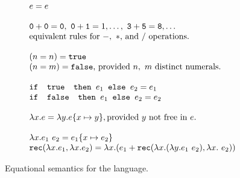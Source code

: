 \begin{figure}
\[
\begin{array}{lr}
e = e \\ \\
\texttt{0} + \texttt{0} = \texttt{0}, \ \texttt{0} + \texttt{1} = 1, \ldots, \ \texttt{3} + \texttt{5} = \texttt{8}, \ldots  \\
\text{equivalent rules for } -, \ * \text{, and } /\text{ operations.}
\\ \\
(n =n) = \texttt{true} \\ (n=m) = \texttt{false}\text{, provided } n, \ m \text{ distinct numerals.}\\ \\ 
\ifelse{\texttt{ true }}{e_1}{e_2} = e_1 \\
\ifelse{\texttt{ false }}{e_1}{e_2} = e_2 \\ \\ 
\lambda x.e = \lambda y.e\{x \mapsto y \}, \text{provided } y \text{ not free in } e. \\ \\ 
\lambda x.e_1 \ e_2 = e_1\{x \mapsto e_2\} \\
\texttt{rec}(\lambda x.e_1, \lambda x.e_2) = 
			\lambda x.(e_1 + \texttt{rec}(\lambda x. (\lambda y.e_1  \ e_2), \lambda x.\ e_2)) \\
\end{array}
\]
\caption{Equational semantics for the language.}
\label{fig:eqsem}
\end{figure}

